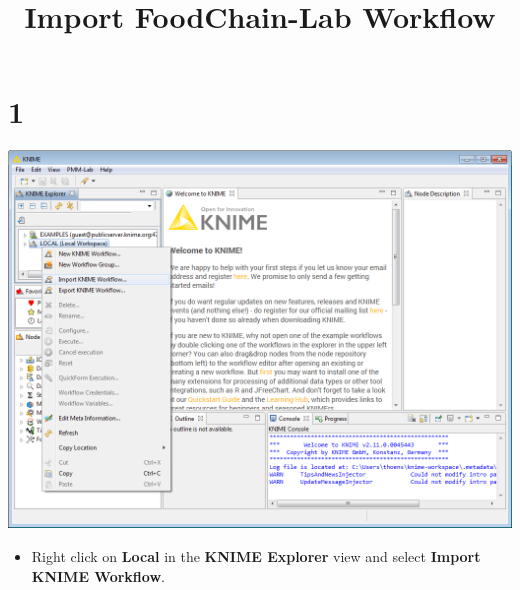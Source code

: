 \documentclass{beamer}
\title{Import FoodChain-Lab Workflow}
\date{}
\begin{document}
\maketitle
 
\section{1}
\begin{frame}
	\begin{center}
  		\includegraphics[height=0.6\textheight]{1.png}
	\end{center}
	\begin{itemize}
		\item Right click on \textbf{Local} in the \textbf{KNIME Explorer} view and select \textbf{Import KNIME Workflow}.
	\end{itemize}
\end{frame}
\end{document}
